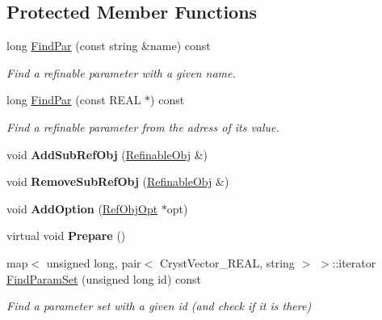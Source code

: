 \subsection*{Protected Member Functions}
\begin{DoxyCompactItemize}
\item 
\mbox{\label{class_obj_cryst_1_1_refinable_obj_a46caa32fb18f6728ecf42bacca789041}} 
long \mbox{\hyperlink{class_obj_cryst_1_1_refinable_obj_a46caa32fb18f6728ecf42bacca789041}{Find\+Par}} (const string \&name) const
\begin{DoxyCompactList}\small\item\em Find a refinable parameter with a given name. \end{DoxyCompactList}\item 
\mbox{\label{class_obj_cryst_1_1_refinable_obj_ae01b2d37ae28ddc96e79f9e2bff0f693}} 
long \mbox{\hyperlink{class_obj_cryst_1_1_refinable_obj_ae01b2d37ae28ddc96e79f9e2bff0f693}{Find\+Par}} (const R\+E\+AL $\ast$) const
\begin{DoxyCompactList}\small\item\em Find a refinable parameter from the adress of its value. \end{DoxyCompactList}\item 
\mbox{\label{class_obj_cryst_1_1_refinable_obj_ae4740b33ea934e4ab9b9bce9ebbfa806}} 
void {\bfseries Add\+Sub\+Ref\+Obj} (\mbox{\hyperlink{class_obj_cryst_1_1_refinable_obj}{Refinable\+Obj}} \&)
\item 
\mbox{\label{class_obj_cryst_1_1_refinable_obj_af533cb95da45c5ce875c9f5ec8cf9c1e}} 
void {\bfseries Remove\+Sub\+Ref\+Obj} (\mbox{\hyperlink{class_obj_cryst_1_1_refinable_obj}{Refinable\+Obj}} \&)
\item 
\mbox{\label{class_obj_cryst_1_1_refinable_obj_a8bd8353b34fc4088a987be0eaf01e5f6}} 
void {\bfseries Add\+Option} (\mbox{\hyperlink{class_obj_cryst_1_1_ref_obj_opt}{Ref\+Obj\+Opt}} $\ast$opt)
\item 
\mbox{\label{class_obj_cryst_1_1_refinable_obj_afe595bfa86b8519e6049bc77e544181e}} 
virtual void {\bfseries Prepare} ()
\item 
\mbox{\label{class_obj_cryst_1_1_refinable_obj_af2042b90302e42e6eec83ba7024df89a}} 
map$<$ unsigned long, pair$<$ Cryst\+Vector\+\_\+\+R\+E\+AL, string $>$ $>$\+::iterator \mbox{\hyperlink{class_obj_cryst_1_1_refinable_obj_af2042b90302e42e6eec83ba7024df89a}{Find\+Param\+Set}} (unsigned long id) const
\begin{DoxyCompactList}\small\item\em Find a parameter set with a given id (and check if it is there) \end{DoxyCompactList}\end{DoxyCompactItemize}
